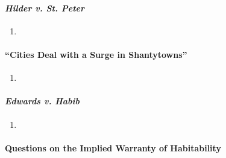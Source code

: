 \paragraph{\emph{Hilder v. St. Peter}} %

\begin{enumerate}
    \item 
\end{enumerate}


\paragraph{``Cities Deal with a Surge in Shantytowns''} %

\begin{enumerate}
    \item 
\end{enumerate}

\paragraph{\emph{Edwards v. Habib}} %

\begin{enumerate}
    \item 
\end{enumerate}

\paragraph{Questions on the Implied Warranty of Habitability} %

